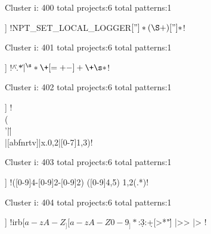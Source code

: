 Cluster i: 400
total projects:6
total patterns:1
\begin{multicols}{1}
\begin{description}[noitemsep,topsep=0pt]
\item [[6] ] \cverb!NPT_SET_LOCAL_LOGGER\s*\([ "]*(\S+)[ "]*\)!
\end{description}
\end{multicols}







Cluster i: 401
total projects:6
total patterns:1
\begin{multicols}{1}
\begin{description}[noitemsep,topsep=0pt]
\item [[6] ] \cverb!^\s*\|\s.*\s\|\s*$|^\s*\+[=+-]+\+\s*$!
\end{description}
\end{multicols}







Cluster i: 402
total projects:6
total patterns:1
\begin{multicols}{1}
\begin{description}[noitemsep,topsep=0pt]
\item [[6] ] \cverb!\\(\\'|\"|\\|[abfnrtv]|x.{0,2}|[0-7]{1,3})!
\end{description}
\end{multicols}







Cluster i: 403
total projects:6
total patterns:1
\begin{multicols}{1}
\begin{description}[noitemsep,topsep=0pt]
\item [[6] ] \cverb!([0-9]{4}-[0-9]{2}-[0-9]{2})  ([0-9]{4,5}) {1,2}(.*)!
\end{description}
\end{multicols}







Cluster i: 404
total projects:6
total patterns:1
\begin{multicols}{1}
\begin{description}[noitemsep,topsep=0pt]
\item [[6] ] \cverb!irb\([a-zA-Z_][a-zA-Z0-9_]*\):\d{3}:\d+[>*"\'] |>> |\?> !
\end{description}
\end{multicols}







